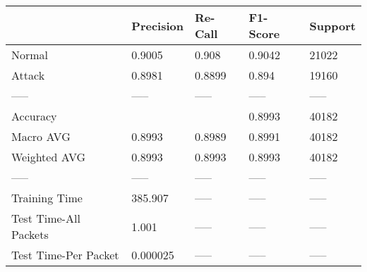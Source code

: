 \begin{tabular}{lllll}
\toprule
{} & Precision & Re-Call & F1-Score & Support \\
\midrule
Normal                &    0.9005 &   0.908 &   0.9042 &   21022 \\
Attack                &    0.8981 &  0.8899 &    0.894 &   19160 \\
-----                 &     ----- &   ----- &    ----- &   ----- \\
Accuracy              &           &         &   0.8993 &   40182 \\
Macro AVG             &    0.8993 &  0.8989 &   0.8991 &   40182 \\
Weighted AVG          &    0.8993 &  0.8993 &   0.8993 &   40182 \\
-----                 &     ----- &   ----- &    ----- &   ----- \\
Training Time         &   385.907 &   ----- &    ----- &   ----- \\
Test Time-All Packets &     1.001 &   ----- &    ----- &   ----- \\
Test Time-Per Packet  &  0.000025 &   ----- &    ----- &   ----- \\
\bottomrule
\end{tabular}
